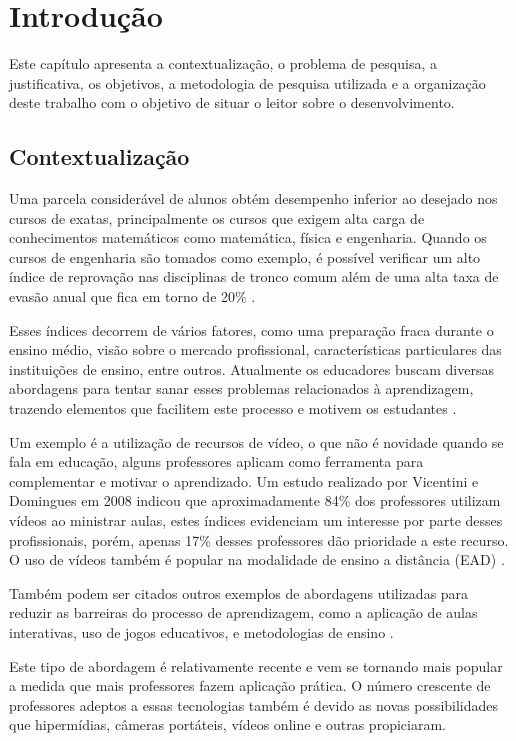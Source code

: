 \chapter[Introdução]{Introdução}

Este capítulo apresenta a contextualização, o problema de pesquisa, a justificativa, os objetivos, a metodologia de pesquisa utilizada e a organização deste trabalho com o objetivo de situar o leitor sobre o desenvolvimento.

\section{Contextualização}

Uma parcela considerável de alunos obtém desempenho inferior ao desejado nos cursos de exatas, principalmente os cursos que exigem alta carga de conhecimentos matemáticos como matemática, física e engenharia. Quando os cursos de engenharia são tomados como exemplo, é possível verificar um alto índice de reprovação nas disciplinas de tronco comum além de uma alta taxa de evasão anual que fica em torno de 20\% \cite{fragelli2012summae}.

Esses índices decorrem de vários fatores, como uma preparação fraca durante o ensino médio, visão sobre o mercado profissional, características particulares das instituições de ensino, entre outros. Atualmente os educadores buscam diversas abordagens para tentar sanar esses problemas relacionados à aprendizagem, trazendo elementos que facilitem este processo e motivem os estudantes \cite{fragelliplaycalculo}. 

Um exemplo é a utilização de recursos de vídeo, o que não é novidade quando se fala em educação, alguns professores aplicam como ferramenta para complementar e motivar o aprendizado. Um estudo realizado por Vicentini e Domingues em 2008 indicou que aproximadamente 84\% dos professores utilizam vídeos ao ministrar aulas, estes índices evidenciam um interesse por parte desses profissionais, porém, apenas 17\% desses professores dão prioridade a este recurso. O uso de vídeos também é popular na modalidade de ensino a distância (EAD) \cite{vicentini2008uso}. 

Também podem ser citados outros exemplos de abordagens utilizadas para reduzir as barreiras do processo de aprendizagem, como a aplicação de aulas interativas, uso de jogos educativos, e metodologias de ensino \cite{fragelli2012osama, fragelli2011batalha, fragelliplaycalculo}.

Este tipo de abordagem é relativamente recente e vem se tornando mais popular a medida que mais professores fazem aplicação prática. O número crescente de professores adeptos a essas tecnologias também é devido as novas possibilidades que hipermídias, câmeras portáteis, vídeos online e outras propiciaram.

